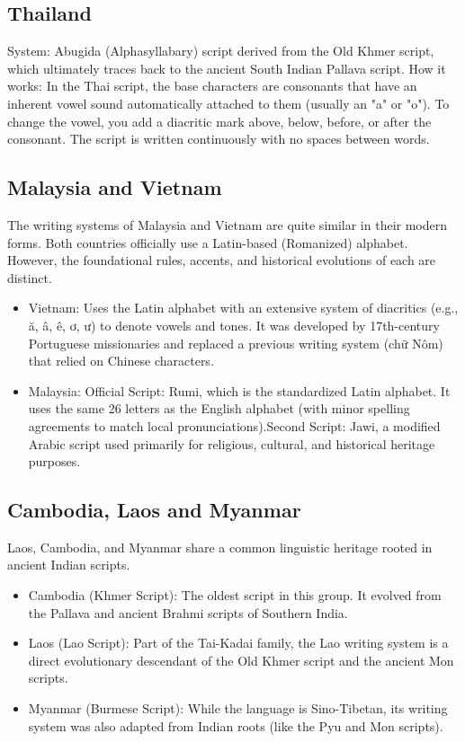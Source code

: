 \documentclass[11pt,a4paper]{report}
\begin{document}
\subsection{Thailand}
System: Abugida (Alphasyllabary) script derived from the Old Khmer script, which ultimately traces back to the ancient South Indian Pallava script. 
How it works: In the Thai script, the base characters are consonants that have an inherent vowel sound automatically attached to them (usually an "a" or "o"). To change the vowel, you add a diacritic mark above, below, before, or after the consonant. The script is written continuously with no spaces between words.

\subsection{Malaysia and Vietnam}
The writing systems of Malaysia and Vietnam are quite similar in their modern forms. Both countries officially use a Latin-based (Romanized) alphabet. However, the foundational rules, accents, and historical evolutions of each are distinct.
\begin{itemize}
  \item Vietnam: Uses the Latin alphabet with an extensive system of diacritics (e.g., ă, â, ê, ơ, ư) to denote vowels and tones. It was developed by 17th-century Portuguese missionaries and replaced a previous writing system (chữ Nôm) that relied on Chinese characters.
  \item Malaysia: Official Script: Rumi, which is the standardized Latin alphabet. It uses the same 26 letters as the English alphabet (with minor spelling agreements to match local pronunciations).Second Script: Jawi, a modified Arabic script used primarily for religious, cultural, and historical heritage purposes.
\end{itemize}
 

\subsection{Cambodia, Laos and Myanmar}
Laos, Cambodia, and Myanmar share a common linguistic heritage rooted in ancient Indian scripts.

\begin{itemize}
  \item Cambodia (Khmer Script): The oldest script in this group. It evolved from the Pallava and ancient Brahmi scripts of Southern India.
  \item Laos (Lao Script): Part of the Tai-Kadai family, the Lao writing system is a direct evolutionary descendant of the Old Khmer script and the ancient Mon scripts.
  \item Myanmar (Burmese Script): While the language is Sino-Tibetan, its writing system was also adapted from Indian roots (like the Pyu and Mon scripts).
\end{itemize}
\end{document}
